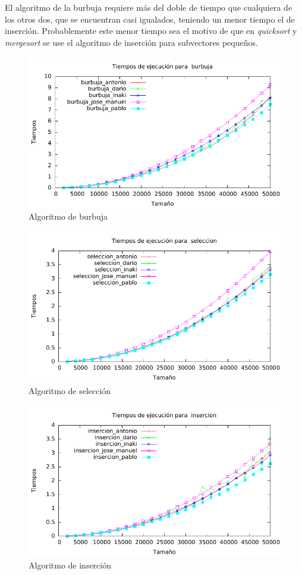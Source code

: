 \documentclass[a4paper, 11pt]{article}
\begin{document}
El algoritmo de la burbuja requiere más del doble de tiempo que cualquiera de los otros dos, que se encuentran casi igualados, teniendo un menor tiempo el de inserción. Probablemente este menor tiempo sea el motivo de que en \textit{quicksort} y \textit{mergesort} se use el algoritmo de inserción para subvectores pequeños.

\begin{figure}[H] \includegraphics[width=15cm]{burbuja_todos_g} \centering
      \caption{Algoritmo de burbuja} \end{figure}

\begin{figure}[H] \includegraphics[width=15cm]{seleccion_todos_g} \centering
      \caption{Algoritmo de selección} \end{figure}

\begin{figure}[H] \includegraphics[width=15cm]{insercion_todos_g} \centering
      \caption{Algoritmo de inserción} \end{figure}
\end{document}
